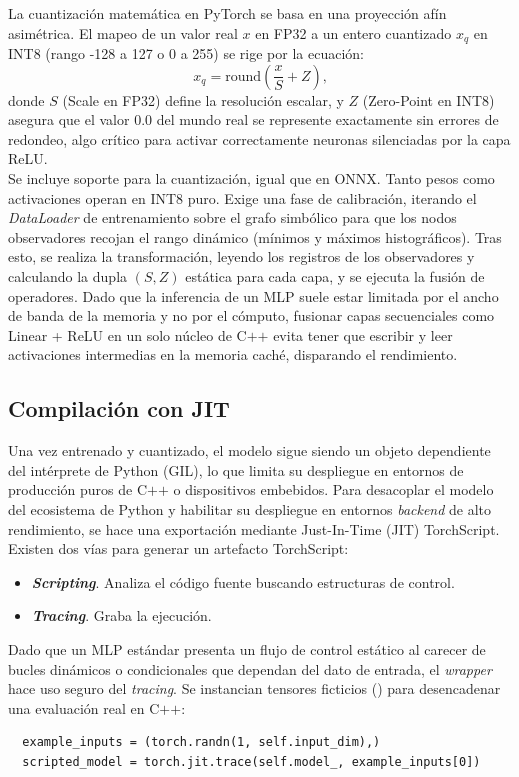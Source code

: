 \documentclass[a4paper,12pt,twoside,final]{book}
\begin{document}
La cuantización matemática en PyTorch se basa en una proyección afín asimétrica. El mapeo de un valor real $x$ en FP32
a un entero cuantizado $x_q$ en INT8 (rango -128 a 127 o 0 a 255) se rige por la ecuación:
\[
x_q = \text{round}\left( \frac{x}{S} + Z \right)\text{,}
\]
donde $S$ (Scale en FP32) define la resolución escalar, y $Z$ (Zero-Point en INT8) asegura que el valor $0.0$ del mundo
real se represente exactamente sin errores de redondeo, algo crítico para activar correctamente neuronas silenciadas
por la capa ReLU.\\

Se incluye soporte para la cuantización, igual que en ONNX. Tanto pesos como activaciones operan en INT8 puro. Exige una
fase de calibración, iterando el \textit{DataLoader} de entrenamiento sobre el grafo simbólico para que los nodos
observadores recojan el rango dinámico (mínimos y máximos histográficos). Tras esto, se realiza la transformación,
leyendo los registros de los observadores y calculando la dupla $(S, Z)$ estática para cada capa, y se ejecuta la fusión
de operadores. Dado que la inferencia de un MLP suele estar limitada por el ancho de banda de la memoria y no por el
cómputo, fusionar capas secuenciales como Linear + ReLU en un solo núcleo de C$+$$+$ evita tener que escribir y leer
activaciones intermedias en la memoria caché, disparando el rendimiento.

\subsection{Compilación con JIT}
Una vez entrenado y cuantizado, el modelo sigue siendo un objeto dependiente del intérprete de Python (GIL), lo que
limita su despliegue en entornos de producción puros de C$+$$+$ o dispositivos embebidos. Para desacoplar el modelo del
ecosistema de Python y habilitar su despliegue en entornos \textit{backend} de alto rendimiento, se hace una exportación
mediante Just-In-Time (JIT) TorchScript.\\

Existen dos vías para generar un artefacto TorchScript:
\begin{itemize}
  \item \textbf{\textit{Scripting}}. Analiza el código fuente buscando estructuras de control.
  \item \textbf{\textit{Tracing}}. Graba la ejecución.
\end{itemize}

Dado que un MLP estándar presenta un flujo de control estático al carecer de bucles dinámicos o condicionales que
dependan del dato de entrada, el \textit{wrapper} hace uso seguro del \textit{tracing}. Se instancian tensores
ficticios () para desencadenar una evaluación real en C$+$$+$:
\begin{verbatim}
  example_inputs = (torch.randn(1, self.input_dim),)
  scripted_model = torch.jit.trace(self.model_, example_inputs[0])
\end{verbatim}
\end{document}
